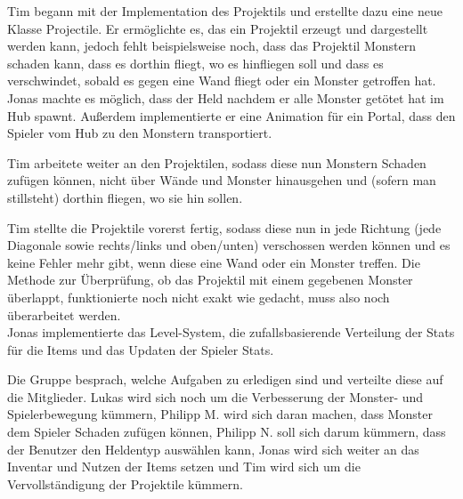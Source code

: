 
Tim begann mit der Implementation des Projektils und erstellte dazu eine neue Klasse \glqq{}Projectile\grqq{}. Er ermöglichte es, das ein Projektil erzeugt und dargestellt werden kann, jedoch fehlt beispielsweise noch, dass das Projektil Monstern schaden kann, dass es dorthin fliegt, wo es hinfliegen soll und dass es verschwindet, sobald es gegen eine Wand fliegt oder ein Monster getroffen hat. \\
Jonas machte es möglich, dass der Held nachdem er alle Monster getötet hat im Hub spawnt. Außerdem implementierte er eine Animation für ein Portal, dass den Spieler vom Hub zu den Monstern transportiert. \\


Tim arbeitete weiter an den Projektilen, sodass diese nun Monstern Schaden zufügen können, nicht über Wände und Monster hinausgehen und (sofern man stillsteht) dorthin fliegen, wo sie hin sollen. \\


Tim stellte die Projektile vorerst fertig, sodass diese nun in jede Richtung (jede Diagonale sowie rechts/links und oben/unten) verschossen werden können und es keine Fehler mehr gibt, wenn diese eine Wand oder ein Monster treffen. Die Methode zur Überprüfung, ob das Projektil mit einem gegebenen Monster überlappt, funktionierte noch nicht exakt wie gedacht, muss also noch überarbeitet werden. \\
Jonas implementierte das Level-System, die zufallsbasierende Verteilung der Stats für die Items und das Updaten der Spieler Stats. \\


Die Gruppe besprach, welche Aufgaben zu erledigen sind und verteilte diese auf die Mitglieder. Lukas wird sich noch um die Verbesserung der Monster- und Spielerbewegung kümmern, Philipp M. wird sich daran machen, dass Monster dem Spieler Schaden zufügen können, Philipp N. soll sich darum kümmern, dass der Benutzer den Heldentyp auswählen kann, Jonas wird sich weiter an das Inventar und Nutzen der Items setzen und Tim wird sich um die Vervollständigung der Projektile kümmern. \\


